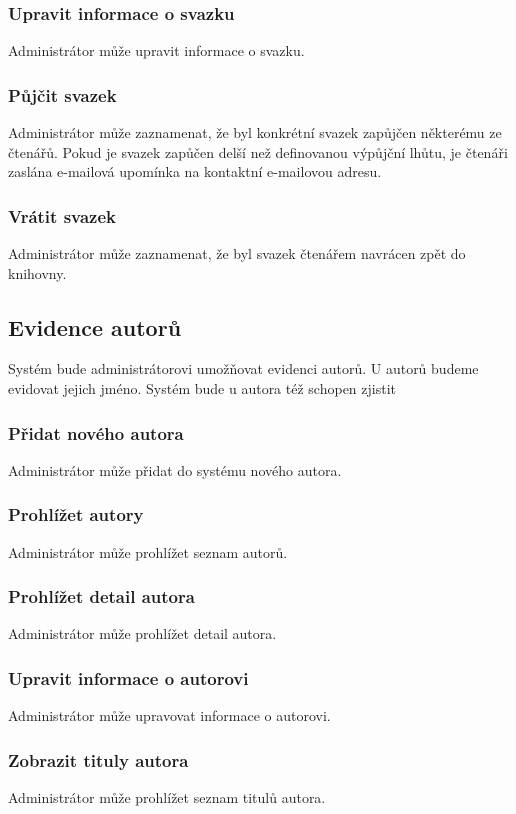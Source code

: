 \documentclass{article}
\begin{document}
\subsubsection{Upravit informace o svazku}
Administrátor může upravit informace o svazku.

\subsubsection{Půjčit svazek}
Administrátor může zaznamenat, že byl konkrétní svazek zapůjčen některému ze
čtenářů. Pokud je svazek zapůčen delší než definovanou výpůjční lhůtu, je
čtenáři zaslána e-mailová upomínka na kontaktní e-mailovou adresu.

\subsubsection{Vrátit svazek}
Administrátor může zaznamenat, že byl svazek čtenářem navrácen zpět do knihovny.

\subsection{Evidence autorů}
Systém bude administrátorovi umožňovat evidenci autorů. U autorů budeme evidovat
jejich jméno. Systém bude u autora též schopen zjistit 

\subsubsection{Přidat nového autora}
Administrátor může přidat do systému nového autora.

\subsubsection{Prohlížet autory}
Administrátor může prohlížet seznam autorů.

\subsubsection{Prohlížet detail autora}
Administrátor může prohlížet detail autora.

\subsubsection{Upravit informace o autorovi}
Administrátor může upravovat informace o autorovi.

\subsubsection{Zobrazit tituly autora}
Administrátor může prohlížet seznam titulů autora.
\end{document}
